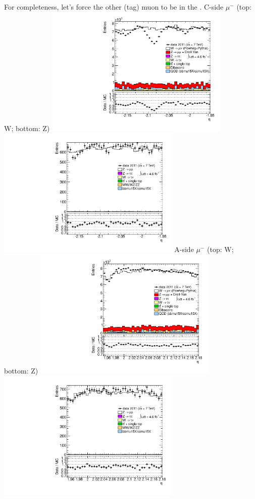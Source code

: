 {
For completeness, let's force the other (tag) muon to be in the .
}
 {
\colb[T]
C-side $\mu^{-}$ (top: W; bottom: Z)
\centering
\includegraphics[width=0.66\textwidth]{dates/20130306/figures/etaphi/W_10_C_stack_l_eta_NEG} \\
\includegraphics[width=0.66\textwidth]{dates/20130306/figures/etaphi/ZlOendcap_10_C_stack_lN_eta_ALL.pdf}
A-side $\mu^{-}$ (top: W; bottom: Z)
\centering
\includegraphics[width=0.66\textwidth]{dates/20130306/figures/etaphi/W_10_A_stack_l_eta_NEG} \\
\includegraphics[width=0.66\textwidth]{dates/20130306/figures/etaphi/ZlOendcap_10_A_stack_lN_eta_ALL.pdf} 
\cole
}

